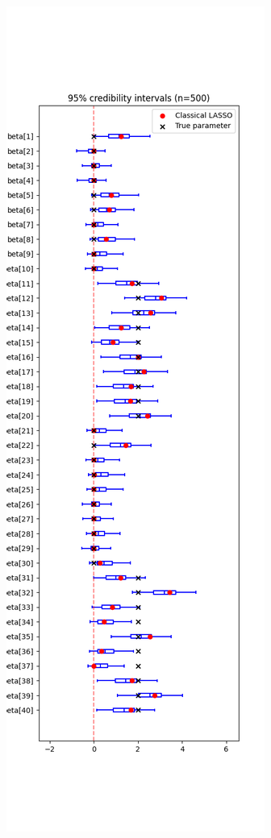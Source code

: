\documentclass[a4paper, 10pt]{article}
\begin{document}
\begin{figure}[htb]
\begin{center}
\begin{minipage}{.47\textwidth}
        \end{minipage}%
        \begin{minipage}{.47\textwidth}
            \centering
            \includegraphics[width=\textwidth]{../outputs/artificial_scenarios_n=100/scenario_4/credibility_intervals.png}

\end{minipage}
\end{center}
\end{figure}
\end{document}
